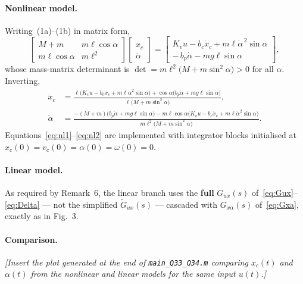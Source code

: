 \documentclass[11pt,a4paper]{article}
\newcommand{\dd}[1]{\dot{#1}}
\newcommand{\ddd}[1]{\ddot{#1}}
\renewcommand{\l}{\ell}
\begin{document}
\paragraph{Nonlinear model.} Writing~(1a)--(1b) in matrix form,
\begin{equation}
\begin{bmatrix}
M+m & m\l\cos\alpha\\
m\l\cos\alpha & m\l^{2}
\end{bmatrix}
\begin{bmatrix}\ddd x_c\\ \ddd\alpha\end{bmatrix}
=
\begin{bmatrix}
K_v u - b_c\dd x_c + m\l\dd\alpha^{\,2}\sin\alpha\\
-\,b_p\dd\alpha - m g \l\sin\alpha
\end{bmatrix},
\end{equation}
whose mass-matrix determinant is
$\det = m\l^{2}\big(M+m\sin^{2}\alpha\big) > 0$ for all $\alpha$. Inverting,
\begin{align}
\ddd{x}_c &=
\frac{\l\big(K_v u - b_c\dd x_c + m\l\dd\alpha^{2}\sin\alpha\big)
      + \cos\alpha\big(b_p\dd\alpha + m g \l\sin\alpha\big)}
     {\l\big(M+m\sin^{2}\alpha\big)},
\label{eq:nl1}\\[4pt]
\ddd{\alpha} &=
\frac{-(M+m)\big(b_p\dd\alpha + m g\l\sin\alpha\big)
      - m\l\cos\alpha\big(K_v u - b_c\dd x_c
        + m\l\dd\alpha^{2}\sin\alpha\big)}
     {m\l^{2}\big(M+m\sin^{2}\alpha\big)} .
\label{eq:nl2}
\end{align}
Equations~\eqref{eq:nl1}--\eqref{eq:nl2} are implemented with integrator
blocks initialised at $x_c(0)=v_c(0)=\alpha(0)=\omega(0)=0$.

\paragraph{Linear model.} As required by Remark~6, the linear branch uses
the \textbf{full} $G_{ux}(s)$ of~\eqref{eq:Gux}--\eqref{eq:Delta} --- not
the simplified $\tilde G_{ux}(s)$ --- cascaded with $G_{x\alpha}(s)$
of~\eqref{eq:Gxa}, exactly as in Fig.~3.

\paragraph{Comparison.} \emph{[Insert the plot generated at the end of
\texttt{main\_Q33\_Q34.m} comparing $x_c(t)$ and $\alpha(t)$ from the
nonlinear and linear models for the same input $u(t)$.]}
\end{document}
